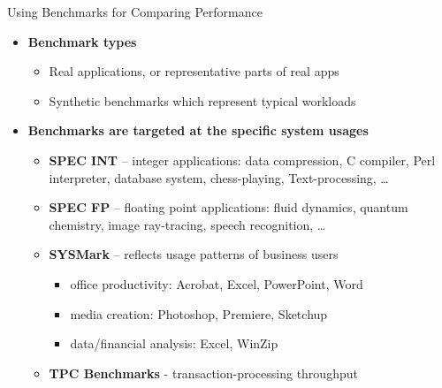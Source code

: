 \documentclass[aspectratio=169,12pt]{beamer}
\begin{document}
\begin{frame}{Using Benchmarks for Comparing Performance}
\begin{itemize}
    \item \textbf{Benchmark types}
    \begin{itemize}
        \item Real applications, or representative parts of real apps
        \item Synthetic benchmarks which represent typical workloads
    \end{itemize}
    \vspace{0.3cm}
    \item \textbf{Benchmarks are targeted at the specific system usages}
    \begin{itemize}
        \item \textbf{SPEC INT} -- integer applications: data compression, C compiler, Perl interpreter, database system, chess-playing, Text-processing, \ldots
        \item \textbf{SPEC FP} -- floating point applications: fluid dynamics, quantum chemistry, image ray-tracing, speech recognition, \ldots
        \item \textbf{SYSMark} -- reflects usage patterns of business users
        \begin{itemize}
            \item office productivity: Acrobat, Excel, PowerPoint, Word
            \item media creation: Photoshop, Premiere, Sketchup
            \item data/financial analysis: Excel, WinZip
        \end{itemize}
        \item \textbf{TPC Benchmarks} - transaction-processing throughput
    \end{itemize}
\end{itemize}
\end{frame}
\end{document}
